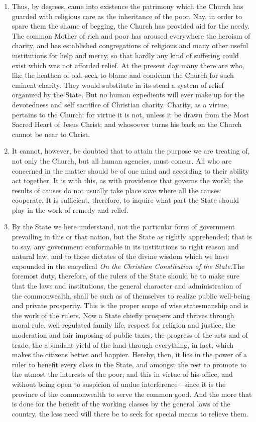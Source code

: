 \documentclass{book}
\begin{document}
\begin{enumerate}
	\item Thus, by degrees, came into existence the patrimony which the Church has guarded with religious care as the inheritance of the poor. Nay, in order to spare them the shame of begging, the Church has provided aid for the needy. The common Mother of rich and poor has aroused everywhere the heroism of charity, and has established congregations of religious and many other useful institutions for help and mercy, so that hardly any kind of suffering could exist which was not afforded relief. At the present day many there are who, like the heathen of old, seek to blame and condemn the Church for such eminent charity. They would substitute in its stead a system of relief organized by the State. But no human expedients will ever make up for the devotedness and self sacrifice of Christian charity. Charity, as a virtue, pertains to the Church; for virtue it is not, unless it be drawn from the Most Sacred Heart of Jesus Christ; and whosoever turns his back on the Church cannot be near to Christ.


	\item It cannot, however, be doubted that to attain the purpose we are treating of, not only the Church, but all human agencies, must concur. All who are concerned in the matter should be of one mind and according to their ability act together. It is with this, as with providence that governs the world; the results of causes do not usually take place save where all the causes cooperate. It is sufficient, therefore, to inquire what part the State should play in the work of remedy and relief.


	\item By the State we here understand, not the particular form of government prevailing in this or that nation, but the State as rightly apprehended; that is to say, any government conformable in its institutions to right reason and natural law, and to those dictates of the divine wisdom which we have expounded in the encyclical \emph{On the Christian Constitution of the State.}\footnotemark[25] The foremost duty, therefore, of the rulers of the State should be to make sure that the laws and institutions, the general character and administration of the commonwealth, shall be such as of themselves to realize public well-being and private prosperity. This is the proper scope of wise statesmanship and is the work of the rulers. Now a State chiefly prospers and thrives through moral rule, well-regulated family life, respect for religion and justice, the moderation and fair imposing of public taxes, the progress of the arts and of trade, the abundant yield of the land-through everything, in fact, which makes the citizens better and happier. Hereby, then, it lies in the power of a ruler to benefit every class in the State, and amongst the rest to promote to the utmost the interests of the poor; and this in virtue of his office, and without being open to suspicion of undue interference—since it is the province of the commonwealth to serve the common good. And the more that is done for the benefit of the working classes by the general laws of the country, the less need will there be to seek for special means to relieve them.



\end{enumerate}
\end{document}
